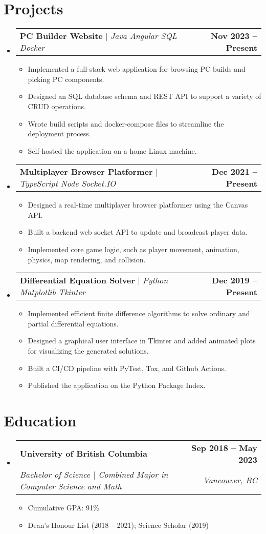\documentclass[letterpaper,11pt]{article}
\makeatletter
\newcommand{\resumeItem}[1]{
  \item\small{
    {#1 \vspace{-2pt}}
  }
}
\newcommand{\resumeSubheading}[4]{
  \vspace{-2pt}\item
    \begin{tabular*}{1.0\textwidth}[t]{l@{\extracolsep{\fill}}r}
      \textbf{#1} & \textbf{\small #2} \\
      \textit{\small#3} & \textit{\small #4} \\
    \end{tabular*}\vspace{-7pt}
}
\newcommand{\resumeProjectHeading}[2]{
    \item
    \begin{tabular*}{1.001\textwidth}{l@{\extracolsep{\fill}}r}
      \small#1 & \textbf{\small #2}\\
    \end{tabular*}\vspace{-7pt}
}
\newcommand{\resumeSubHeadingListStart}{\begin{itemize}[leftmargin=0.0in, label={}]}
\newcommand{\resumeSubHeadingListEnd}{\end{itemize}}
\newcommand{\resumeItemListStart}{\begin{itemize}}
\newcommand{\resumeItemListEnd}{\end{itemize}\vspace{-5pt}}
\makeatother
\begin{document}
\section{Projects}
    \vspace{-5pt}
    \resumeSubHeadingListStart
      \resumeProjectHeading
          {\textbf{PC Builder Website} $|$ \emph{Java \textperiodcentered{} Angular \textperiodcentered{} SQL \textperiodcentered{} Docker}}{Nov 2023 -- Present}
          \resumeItemListStart
            \resumeItem{Implemented a full-stack web application for browsing PC builds and picking PC components.}
            \resumeItem{Designed an SQL database schema and REST API to support a variety of CRUD operations.}
            \resumeItem{Wrote build scripts and docker-compose files to streamline the deployment process.}
            \resumeItem{Self-hosted the application on a home Linux machine.}
          \resumeItemListEnd
          \vspace{-13pt}
      \resumeProjectHeading
          {\textbf{Multiplayer Browser Platformer} $|$ \emph{TypeScript \textperiodcentered{} Node \textperiodcentered{} Socket.IO}}{Dec 2021 -- Present}
          \resumeItemListStart
            \resumeItem{Designed a real-time multiplayer browser platformer using the Canvas API.}
            \resumeItem{Built a backend web socket API to update and broadcast player data.}
            \resumeItem{Implemented core game logic, such as player movement, animation, physics, map rendering, and collision.}
          \resumeItemListEnd
          \vspace{-13pt}
      \resumeProjectHeading
          {\textbf{Differential Equation Solver} $|$ \emph{Python \textperiodcentered{} Matplotlib \textperiodcentered{} Tkinter}}{Dec 2019 -- Present}
          \resumeItemListStart
            \resumeItem{Implemented efficient finite difference algorithms to solve ordinary and partial differential equations.}
            \resumeItem{Designed a graphical user interface in Tkinter and added animated plots for visualizing the generated solutions.}
            \resumeItem{Built a CI/CD pipeline with PyTest, Tox, and Github Actions.}
            \resumeItem{Published the application on the Python Package Index.}
          \resumeItemListEnd
    \resumeSubHeadingListEnd
\vspace{-15pt}

\section{Education}
  \resumeSubHeadingListStart
    \resumeSubheading
      {University of British Columbia}{Sep 2018 -- May 2023}
      {Bachelor of Science $|$ Combined Major in Computer Science and Math}{Vancouver, BC}
      \resumeItemListStart
        \resumeItem{Cumulative GPA: 91\%}
        \resumeItem{Dean's Honour List (2018 -- 2021); Science Scholar (2019)}
      \resumeItemListEnd
  \resumeSubHeadingListEnd
\end{document}
